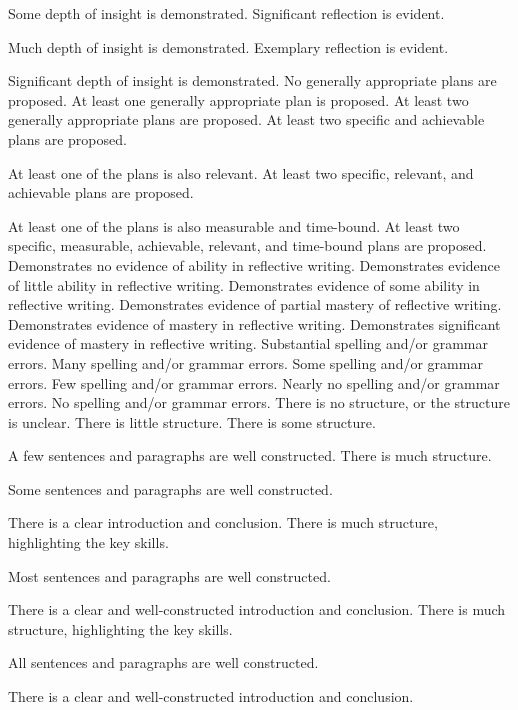 \documentclass{../fal_assignment}
\begin{document}
\begin{markingrubric}
        \par 		Some depth of insight is demonstrated.
        \grade 		Significant reflection is evident.
        \par 		Much depth of insight is demonstrated.
        \grade 		Exemplary reflection is evident.
        \par 		Significant depth of insight is demonstrated.
%
        \grade\fail 	No generally appropriate plans are proposed.
        \grade 		At least one generally appropriate plan is proposed.
        \grade 		At least two generally appropriate plans are proposed.
        \grade 		At least two specific and achievable plans are proposed. 
        \par 		At least one of the plans is also relevant.
        \grade 		At least two specific, relevant, and achievable plans are proposed. 
        \par 		At least one of the plans is also measurable and time-bound.
        \grade 		At least two specific, measurable, achievable, relevant, and time-bound plans are proposed. 
%
        \grade\fail 	Demonstrates no evidence of ability in reflective writing.
        \grade 		Demonstrates evidence of little ability in reflective writing.
        \grade 		Demonstrates evidence of some ability in reflective writing.  
        \grade 		Demonstrates evidence of partial mastery of reflective writing.
        \grade 		Demonstrates evidence of mastery in reflective writing.
        \grade 		Demonstrates significant evidence of mastery in reflective writing.
%
        \grade\fail 	Substantial spelling and/or grammar errors.
        \grade 		Many spelling and/or grammar errors.
        \grade 		Some spelling and/or grammar errors.  
        \grade 		Few spelling and/or grammar errors.
        \grade 		Nearly no spelling and/or grammar errors.
        \grade 		No spelling and/or grammar errors.
%
        \grade\fail 	There is no structure, or the structure is unclear.
        \grade 		There is little structure.
        \grade 		There is some structure.
        \par 		A few sentences and paragraphs are well constructed.
        \grade 		There is much structure.
        \par 		Some sentences and paragraphs are well constructed.
        \par 		There is a clear introduction and conclusion.
        \grade 		There is much structure, highlighting the key skills.
        \par 		Most sentences and paragraphs are well constructed.
        \par 		There is a clear and well-constructed introduction and conclusion.
        \grade 		There is much structure, highlighting the key skills.
        \par 		All sentences and paragraphs are well constructed.
        \par 		There is a clear and well-constructed introduction and conclusion.
\end{markingrubric}
\end{document}
